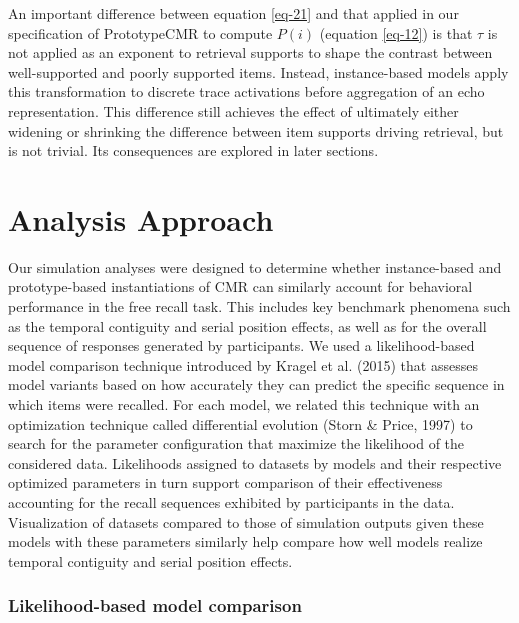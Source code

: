\documentclass[
  letterpaper,
  DIV=11,
  numbers=noendperiod]{scrreport}
\begin{document}
An important difference between equation \ref{eq-21} and that applied in
our specification of PrototypeCMR to compute \(P(i)\) (equation
\ref{eq-12}) is that \(\tau\) is not applied as an exponent to retrieval
supports to shape the contrast between well-supported and poorly
supported items. Instead, instance-based models apply this
transformation to discrete trace activations before aggregation of an
echo representation. This difference still achieves the effect of
ultimately either widening or shrinking the difference between item
supports driving retrieval, but is not trivial. Its consequences are
explored in later sections.


\hypertarget{analysis-approach}{%
\chapter{Analysis Approach}\label{analysis-approach}}

Our simulation analyses were designed to determine whether
instance-based and prototype-based instantiations of CMR can similarly
account for behavioral performance in the free recall task. This
includes key benchmark phenomena such as the temporal contiguity and
serial position effects, as well as for the overall sequence of
responses generated by participants. We used a likelihood-based model
comparison technique introduced by Kragel et al. (2015) that assesses
model variants based on how accurately they can predict the specific
sequence in which items were recalled. For each model, we related this
technique with an optimization technique called differential evolution
(Storn \& Price, 1997) to search for the parameter configuration that
maximize the likelihood of the considered data. Likelihoods assigned to
datasets by models and their respective optimized parameters in turn
support comparison of their effectiveness accounting for the recall
sequences exhibited by participants in the data. Visualization of
datasets compared to those of simulation outputs given these models with
these parameters similarly help compare how well models realize temporal
contiguity and serial position effects.

\hypertarget{likelihood-based-model-comparison}{%
\subsection{Likelihood-based model
comparison}\label{likelihood-based-model-comparison}}
\end{document}
